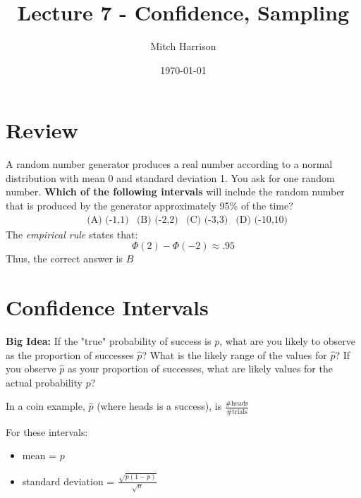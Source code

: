 \documentclass[titlepage, 12pt, leqno]{article}
\title{\Huge{Lecture 7 - Confidence, Sampling}}
\author{\large{Mitch Harrison}}
\date{\today}
\begin{document}
\setlength{\parskip}{1\baselineskip}
\setlength{\parindent}{15pt}
\maketitle
\tableofcontents
\newpage


\section{Review}

\begin{ex}
    A random number generator produces a real number according to a normal distribution with mean 0 and standard deviation 1. You ask for one random number. \textbf{Which of the following intervals} will include the random number that is produced by the generator approximately 95\% of the time?
\begin{align*}
    & \text{(A) (-1,1)} & \text{(B) (-2,2)} & \text{(C) (-3,3)} & \text{(D) (-10,10)}
\end{align*}
The \textit{empirical rule} states that:
\[
\Phi(2) - \Phi(-2) \approx .95
\]
Thus, the correct answer is $\boxed{B}$
\end{ex}

\pagebreak

\section{Confidence Intervals}

\textbf{Big Idea:} If the "true" probability of success is $p$, what are you likely to observe as the proportion of successes $\hat p$? What is the likely range of the values for $\hat p$? If you observe $\hat p$ as your proportion of successes, what are likely values for the actual probability $p$?

In a coin example, $\hat p$ (where heads is a success), is $\frac{ \text{\# heads}}{ \text{\# trials}} $

For these intervals:
\begin{itemize}
    \item mean = $p$
    \item standard deviation = $\frac{\sqrt{p(1-p)}}{\sqrt{n}}$
\end{itemize}
\end{document}
